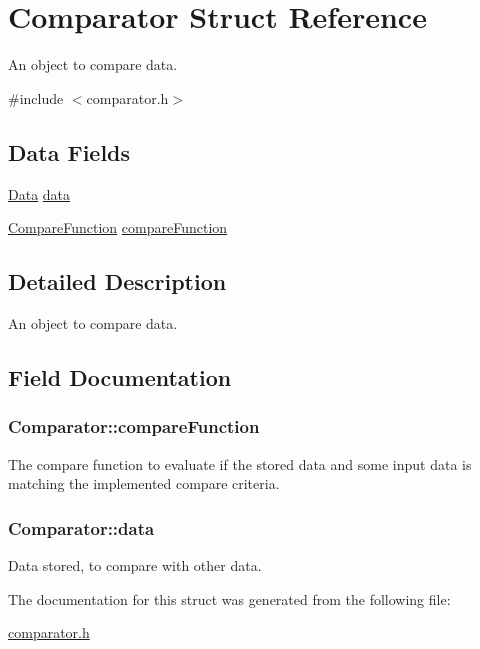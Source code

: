 \hypertarget{structComparator}{}\section{Comparator Struct Reference}
\label{structComparator}


An object to compare data.  




{\ttfamily \#include $<$comparator.\+h$>$}

\subsection*{Data Fields}
\begin{DoxyCompactItemize}
\item 
\hyperlink{basic_8h_a5f051eaa796886555205c751e6d530f4}{Data} \hyperlink{structComparator_a6d1641e7a7be309c8aeb308f4b9032af}{data}
\item 
\hyperlink{comparator_8h_a7031dbbb6ddea05773826b8d54940494}{Compare\+Function} \hyperlink{structComparator_aa308e51b1d9b8ad152c7f36c3001dc7d}{compare\+Function}
\end{DoxyCompactItemize}


\subsection{Detailed Description}
An object to compare data. 

\subsection{Field Documentation}
\subsubsection[{\texorpdfstring{compare\+Function}{compareFunction}}]{ Comparator\+::compare\+Function}\hypertarget{structComparator_aa308e51b1d9b8ad152c7f36c3001dc7d}{}\label{structComparator_aa308e51b1d9b8ad152c7f36c3001dc7d}
The compare function to evaluate if the stored data and some input data is matching the implemented compare criteria. 
\subsubsection[{\texorpdfstring{data}{data}}]{ Comparator\+::data}\hypertarget{structComparator_a6d1641e7a7be309c8aeb308f4b9032af}{}\label{structComparator_a6d1641e7a7be309c8aeb308f4b9032af}
Data stored, to compare with other data. 

The documentation for this struct was generated from the following file\+:\begin{DoxyCompactItemize}
\item 
\hyperlink{comparator_8h}{comparator.\+h}\end{DoxyCompactItemize}

